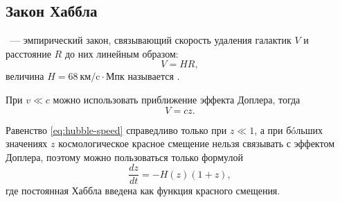 \subsection{Закон Хаббла}
~--- эмпирический закон, связывающий скорость удаления галактик $V$ и расстояние $R$ до них линейным образом:
\begin{equation}
	V = H R,
\end{equation}
величина $H=68~\text{км/c} \cdot \text{Мпк}$ называется .

При $v \ll c$ можно использовать приближение эффекта Доплера, тогда
\begin{equation}
	V = c z.
	\label{eq:hubble-speed}
\end{equation}

Равенство \eqref{eq:hubble-speed} справедливо только при $z \ll 1$, а при б\'{o}льших значениях $z$ космологическое красное смещение нельзя связывать с эффектом Доплера, поэтому можно пользоваться только формулой
\begin{equation}
	\frac{dz}{dt} = - H(z)(1+z),
\end{equation}
где постоянная Хаббла введена как функция красного смещения.
